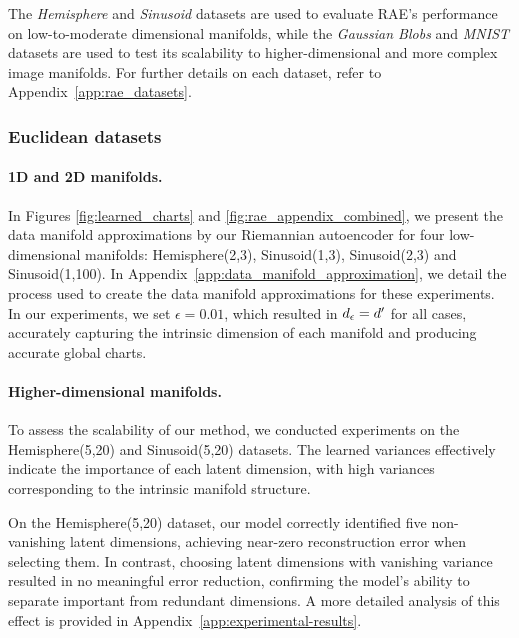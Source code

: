     The \textit{Hemisphere} and \textit{Sinusoid} datasets are used to evaluate RAE's performance on low-to-moderate dimensional manifolds, while the \textit{Gaussian Blobs} and \textit{MNIST} datasets are used to test its scalability to higher-dimensional and more complex image manifolds. For further details on each dataset, refer to Appendix~\ref{app:rae_datasets}.


    \subsubsection{Euclidean datasets}
    \label{sec:euclidean_datasets}

    \paragraph{1D and 2D manifolds.}
    In Figures \ref{fig:learned_charts} and \ref{fig:rae_appendix_combined}, we present the data manifold approximations by our Riemannian autoencoder for four low-dimensional manifolds: Hemisphere(2,3), Sinusoid(1,3), Sinusoid(2,3) and Sinusoid(1,100). In Appendix~\ref{app:data_manifold_approximation}, we detail the process used to create the data manifold approximations for these experiments. In our experiments, we set \( \epsilon = 0.01 \), which resulted in \( d_{\epsilon} = d' \) for all cases, accurately capturing the intrinsic dimension of each manifold and producing accurate global charts.



    \paragraph{Higher-dimensional manifolds.}

    To assess the scalability of our method, we conducted experiments on the Hemisphere(5,20) and Sinusoid(5,20) datasets. The learned variances effectively indicate the importance of each latent dimension, with high variances corresponding to the intrinsic manifold structure. 

    On the Hemisphere(5,20) dataset, our model correctly identified five non-vanishing latent dimensions, achieving near-zero reconstruction error when selecting them. In contrast, choosing latent dimensions with vanishing variance resulted in no meaningful error reduction, confirming the model’s ability to separate important from redundant dimensions. A more detailed analysis of this effect is provided in Appendix~\ref{app:experimental-results}.

